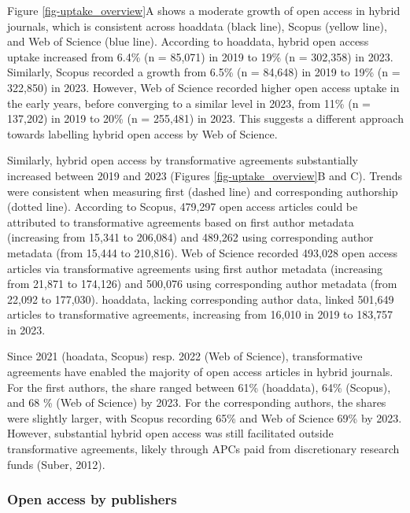 \documentclass[a4paper,man,floatsintext,longtable,noextraspace,10pt]{apa6}
\begin{document}
Figure \ref{fig-uptake_overview}A shows a moderate growth of open access
in hybrid journals, which is consistent across hoaddata (black line),
Scopus (yellow line), and Web of Science (blue line). According to
hoaddata, hybrid open access uptake increased from 6.4\% (n = 85,071) in
2019 to 19\% (n = 302,358) in 2023. Similarly, Scopus recorded a growth
from 6.5\% (n = 84,648) in 2019 to 19\% (n = 322,850) in 2023. However,
Web of Science recorded higher open access uptake in the early years,
before converging to a similar level in 2023, from 11\% (n = 137,202) in
2019 to 20\% (n = 255,481) in 2023. This suggests a different approach
towards labelling hybrid open access by Web of Science.

Similarly, hybrid open access by transformative agreements substantially
increased between 2019 and 2023 (Figures \ref{fig-uptake_overview}B and
C). Trends were consistent when measuring first (dashed line) and
corresponding authorship (dotted line). According to Scopus, 479,297
open access articles could be attributed to transformative agreements
based on first author metadata (increasing from 15,341 to 206,084) and
489,262 using corresponding author metadata (from 15,444 to 210,816).
Web of Science recorded 493,028 open access articles via transformative
agreements using first author metadata (increasing from 21,871 to
174,126) and 500,076 using corresponding author metadata (from 22,092 to
177,030). hoaddata, lacking corresponding author data, linked 501,649
articles to transformative agreements, increasing from 16,010 in 2019 to
183,757 in 2023.

Since 2021 (hoadata, Scopus) resp. 2022 (Web of Science), transformative
agreements have enabled the majority of open access articles in hybrid
journals. For the first authors, the share ranged between 61\%
(hoaddata), 64\% (Scopus), and 68 \% (Web of Science) by 2023. For the
corresponding authors, the shares were slightly larger, with Scopus
recording 65\% and Web of Science 69\% by 2023. However, substantial
hybrid open access was still facilitated outside transformative
agreements, likely through APCs paid from discretionary research funds
(Suber, 2012).

\subsubsection{Open access by
publishers}\label{open-access-by-publishers}
\end{document}
